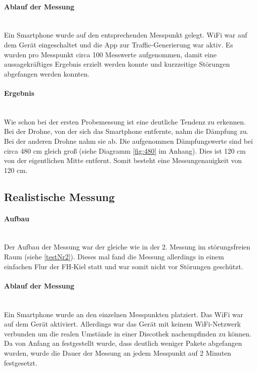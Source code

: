\documentclass[a4paper]{spie}  %
\begin{document}
\paragraph{Ablauf der Messung}\mbox{}\\
Ein Smartphone wurde auf den entsprechenden Messpunkt gelegt. WiFi war auf dem Gerät eingeschaltet und die App zur Traffic-Generierung war aktiv. Es wurden pro Messpunkt circa 100 Messwerte aufgenommen, damit eine aussagekräftiges Ergebnis erzielt werden konnte und kurzzeitige Störungen abgefangen werden konnten.

\paragraph{Ergebnis}\mbox{}\\
Wie schon bei der ersten Probemessung ist eine deutliche Tendenz zu erkennen. Bei der Drohne, von der sich das Smartphone entfernte, nahm die Dämpfung zu. Bei der anderen Drohne nahm sie ab. Die aufgenommen Dämpfungswerte sind bei circa 480 cm gleich groß (siehe Diagramm \ref{fig:480} im Anhang). Dies ist 120 cm von der eigentlichen Mitte entfernt. Somit besteht eine Messungenauigkeit von 120 cm.

\subsection{Realistische Messung}
\paragraph{Aufbau}\mbox{}\\
Der Aufbau der Messung war der gleiche wie in der 2. Messung im störungsfreien Raum (siehe \ref{testNr2}). Dieses mal fand die Messung allerdings in einem einfachen Flur der FH-Kiel statt und war somit nicht vor Störungen geschützt.

\paragraph{Ablauf der Messung}\mbox{}\\
Ein Smartphone wurde an den einzelnen Messpunkten platziert. Das WiFi war auf dem Gerät aktiviert. Allerdings war das Gerät mit keinem WiFi-Netzwerk verbunden um die realen Umstände in einer Discothek nachempfinden zu können. Da von Anfang an festgestellt wurde, dass deutlich weniger Pakete abgefangen wurden, wurde die Dauer der Messung an jedem Messpunkt auf 2 Minuten festgesetzt.
\end{document}
